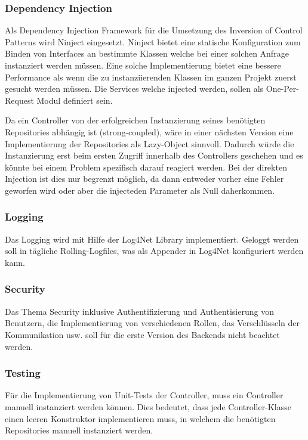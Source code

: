 \documentclass[a4paper,10pt,xetex]{article}
\begin{document}
\bigskip

\subsubsection[Dependency Injection]{Dependency Injection}
	Als Dependency Injection Framework f\"ur die Umsetzung des Inversion of Control Patterns wird Ninject eingesetzt.
	Ninject bietet eine statische Konfiguration zum Binden von Interfaces an bestimmte Klassen welche bei einer solchen
	Anfrage instanziert werden m\"ussen. Eine solche Implementierung bietet eine bessere Performance als wenn die zu
	instanziierenden Klassen im ganzen Projekt zuerst gesucht werden m\"ussen. Die Services welche injected werden, sollen
	als One-Per-Request Modul definiert sein. 


	Da ein Controller von der erfolgreichen Instanzierung seines ben\"otigten Repositories abh\"angig ist (strong-coupled),
	w\"are in einer n\"achsten Version eine Implementierung der Repositories als Lazy-Object sinnvoll. Dadurch w\"urde die
	Instanzierung erst beim ersten Zugriff innerhalb des Controllers geschehen und es k\"onnte bei einem Problem spezifisch
	darauf reagiert werden. Bei der direkten Injection ist dies nur begrenzt m\"oglich, da dann entweder vorher eine Fehler
	geworfen wird oder aber die injecteden Parameter als Null daherkommen.


\subsubsection[Logging]{Logging}

	Das Logging wird mit Hilfe der Log4Net Library implementiert. Geloggt werden soll in t\"agliche Rolling-Logfiles, was
	als Appender in Log4Net konfiguriert werden kann.


\bigskip

\subsubsection[Security]{Security}
	Das Thema Security inklusive Authentifizierung und Authentisierung von Benutzern, die Implementierung von verschiedenen
	Rollen, das Verschl\"usseln der Kommunikation usw. soll f\"ur die erste Version des Backends nicht beachtet werden.

\subsubsection[Testing\ \ ]{Testing\ \ }
	F\"ur die Implementierung von Unit-Tests der Controller, muss ein Controller manuell instanziert werden k\"onnen. Dies
	bedeutet, dass jede Controller-Klasse einen leeren Konstruktor implementieren muss, in welchem die ben\"otigten
	Repositories manuell instanziert werden.
\end{document}
